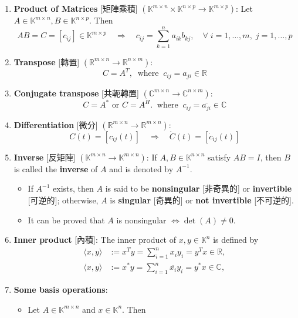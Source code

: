 \documentclass{article}
\theoremstyle{definition}
\numberwithin{theorem}{section}
\numberwithin{equation}{section}
\begin{document}
\begin{enumerate}
    \item \textbf{Product of Matrices} [矩陣乘積] $(\mathbb{K}^{m \times n} \times \mathbb{K}^{n \times p} \to \mathbb{K}^{m \times p})$: Let $A\in \mathbb{K}^{m \times n}, B\in \mathbb{K}^{n \times p}$. Then  
  \[
    AB= C=[c_{ij}] \in \mathbb{K}^{m \times p} \quad\Longrightarrow \quad c_{ij} = \sum_{k=1}^{n} a_{ik} b_{kj},\quad \forall\; i = 1, \ldots, m,\; j = 1, \ldots, p
   \]
   \item  \textbf{Transpose} [轉置] $(\mathbb{R}^{m \times n} \to \mathbb{R}^{n \times m} )$:
  \[
   C = A^T, \;\; \text{where}\;\; c_{ij} = a_{ji} \in \mathbb{R}
   \]
   \item  \textbf{Conjugate transpose} [共軛轉置] $(\mathbb{C}^{m \times n} \to \mathbb{C}^{n \times m})$:
  \[
   C = A^* \text{ or } C = A^H. \;\; \text{where} \;\; c_{ij} = \overline{a_{ji}} \in \mathbb{C}
   \]
   \item\textbf{Differentiation} [微分] $(\mathbb{R}^{m \times n} \to \mathbb{R}^{m \times n})$:
  \[
   C(t) = [ c_{ij}(t) ] \quad \Longrightarrow \quad \dot{C}(t) = [\dot{c}_{ij}(t)]
   \]
    \item \textbf{Inverse} [反矩陣] $(\mathbb{K}^{m \times n} \to \mathbb{K}^{m \times n})$: If $A,B \in \mathbb{K}^{n \times n}$ satisfy $AB = I$, then $B$ is called the \textbf{inverse} of $A$ and is denoted by $A^{-1}$.
  \begin{itemize}
  \item    If $A^{-1}$ exists, then $A$ is said to be \textbf{nonsingular} [非奇異的] or \textbf{invertible} [可逆的]; otherwise, $A$ is \textbf{singular} [奇異的] or \textbf{not invertible} [不可逆的].
  \item   It can be proved that $A$ is nonsingular $\Longleftrightarrow \det(A) \neq 0$.
  \end{itemize}
  \item \textbf{Inner product} [內積]: The inner product of $x,y \in \mathbb{K}^{n}$ is defined by
   \begin{align*}
   \langle x, y \rangle &:= x^T y = \sum_{i=1}^{n} x_i y_i = y^T x \in \mathbb{R},\\
   \langle x, y \rangle &:= x^* y = \sum_{i=1}^{n} \overline{x_i} y_i = y^* x \in \mathbb{C},
   \end{align*}
   \item \textbf{Some basis operations}:
  \begin{itemize}
  \item Let $A \in \mathbb{K}^{m \times n}$ and $x \in \mathbb{K}^{n}$. Then

\end{itemize}
\end{enumerate}
\end{document}
